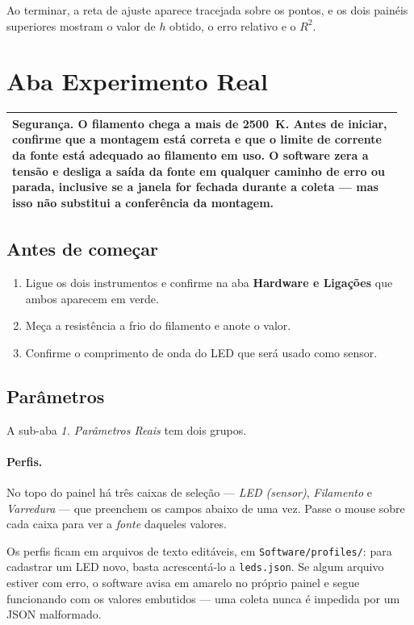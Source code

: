 \documentclass[11pt,a4paper]{article}
\newcommand{\aba}[1]{\textsf{\textbf{#1}}}
\newcommand{\campo}[1]{\textsf{\textit{#1}}}
\newenvironment{aviso}
  {\par\medskip\noindent\begin{tabular}{|p{0.96\linewidth}|}\hline\rule{0pt}{3ex}}
  {\\[1ex]\hline\end{tabular}\par\medskip}
\begin{document}
Ao terminar, a reta de ajuste aparece tracejada sobre os pontos, e os dois
painéis superiores mostram o valor de $h$ obtido, o erro relativo e o $R^2$.

\section{Aba Experimento Real}

\begin{aviso}
\textbf{Segurança.} O filamento chega a mais de 2500~K. Antes de iniciar,
confirme que a montagem está correta e que o limite de corrente da fonte está
adequado ao filamento em uso. O software zera a tensão e desliga a saída da
fonte em qualquer caminho de erro ou parada, inclusive se a janela for fechada
durante a coleta --- mas isso não substitui a conferência da montagem.
\end{aviso}

\subsection{Antes de começar}

\begin{enumerate}[nosep]
  \item Ligue os dois instrumentos e confirme na aba \aba{Hardware e Ligações}
        que ambos aparecem em verde.
  \item Meça a resistência a frio do filamento e anote o valor.
  \item Confirme o comprimento de onda do LED que será usado como sensor.
\end{enumerate}

\subsection{Parâmetros}

A sub-aba \campo{1. Parâmetros Reais} tem dois grupos.

\paragraph{Perfis.}
No topo do painel há três caixas de seleção --- \campo{LED (sensor)},
\campo{Filamento} e \campo{Varredura} --- que preenchem os campos abaixo de uma
vez. Passe o mouse sobre cada caixa para ver a \emph{fonte} daqueles valores.

Os perfis ficam em arquivos de texto editáveis, em \texttt{Software/profiles/}:
para cadastrar um LED novo, basta acrescentá-lo a \texttt{leds.json}. Se algum
arquivo estiver com erro, o software avisa em amarelo no próprio painel e segue
funcionando com os valores embutidos --- uma coleta nunca é impedida por um
JSON malformado.
\end{document}
